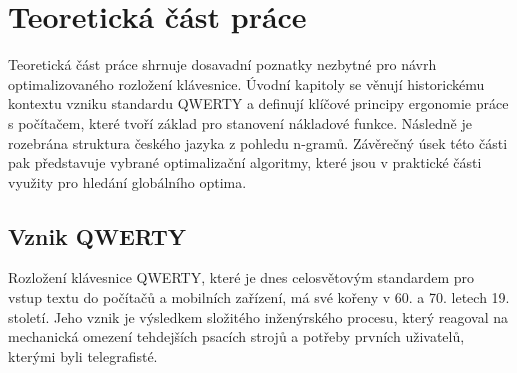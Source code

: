 \documentclass[a4paper, twoside, 12pt, czech]{article}
\begin{document}
\newpage
\section{Teoretická část práce}

Teoretická část práce shrnuje dosavadní poznatky nezbytné pro návrh 
optimalizovaného rozložení klávesnice. Úvodní kapitoly se věnují historickému 
kontextu vzniku standardu QWERTY a definují klíčové principy ergonomie práce s 
počítačem, které tvoří základ pro stanovení nákladové funkce. Následně je 
rozebrána struktura českého jazyka z pohledu n-gramů. Závěrečný úsek této 
části pak představuje vybrané optimalizační algoritmy, 
které jsou v praktické části využity pro hledání globálního optima.

\subsection{Vznik QWERTY}
Rozložení klávesnice QWERTY, které je dnes celosvětovým standardem pro vstup 
textu do počítačů a mobilních zařízení, má své kořeny v 60. a 70. letech 19. 
století. Jeho vznik je výsledkem složitého inženýrského procesu, který reagoval 
na mechanická omezení tehdejších psacích strojů a potřeby prvních uživatelů, kterými
byli telegrafisté.
\end{document}
